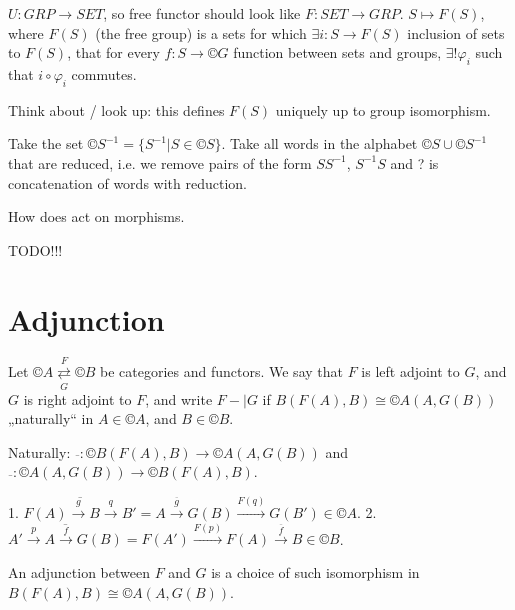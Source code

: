 \documentclass[12pt]{article}					%
\begin{document}
\begin{priklady}
	$U: GRP \rightarrow SET$, so free functor should look like $F: SET \rightarrow GRP$. $S \mapsto F(S)$, where $F(S)$ (the free group) is a sets for which $\exists i: S \rightarrow F(S)$ inclusion of sets to $F(S)$, that for every $f: S \rightarrow ©G$ function between sets and groups, $\exists! φ_i$ such that $i ∘ φ_i$ commutes.

	Think about / look up: this defines $F(S)$ uniquely up to group isomorphism.
\end{priklady}

\begin{priklad}
	Take the set $©S^{-1} = \{S^{-1} | S \in ©S\}$. Take all words in the alphabet $©S\cup ©S^{-1}$ that are reduced, i.e. we remove pairs of the form $SS^{-1}$, $S^{-1}S$ and ? is concatenation of words with reduction.
\end{priklad}

\begin{priklad}
	How does act on morphisms.
\end{priklad}


TODO!!!


\section{Adjunction}
\begin{definice}
	Let $©A \overset{F}{\underset{G}\rightleftarrows} ©B$ be categories and functors. We say that $F$ is left adjoint to $G$, and $G$ is right adjoint to $F$, and write $F -| G$ if $B(F(A), B) \cong ©A(A, G(B))$ „naturally“ in $A \in ©A$, and $B \in ©B$.

	\begin{poznamkain}
		Naturally: $\overline{\ }: ©B(F(A), B) \rightarrow ©A(A, G(B))$ and $\overline{\ }: ©A(A, G(B)) \rightarrow ©B(F(A), B)$.

		1. $\overline{F(A) \overset{g}\rightarrow B \overset{q}\rightarrow B'} = A \overset{\overline{g}}\rightarrow G(B) \overset{F(q)}\rightarrow G(B') \in ©A$.
		2. $\overline{A' \overset{p}\rightarrow A \overset{f}\rightarrow G(B)} = F(A') \overset{F(p)}\rightarrow F(A) \overset{\overline{f}}\rightarrow B \in ©B$.

		An adjunction between $F$ and $G$ is a choice of such isomorphism in $B(F(A), B) \cong ©A(A, G(B))$.
	\end{poznamkain}
\end{definice}
\end{document}
